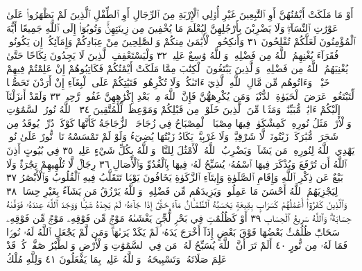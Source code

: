 أَوْ مَا مَلَكَتْ أَيْمَٰنُهُنَّ أَوِ ٱلتَّٰبِعِينَ غَيْرِ أُو۟لِي ٱلْإِرْبَةِ مِنَ
ٱلرِّجَالِ أَوِ ٱلطِّفْلِ ٱلَّذِينَ لَمْ يَظْهَرُوا۟ عَلَىٰ عَوْرَٰتِ ٱلنِّسَآءِۖ
وَلَا يَضْرِبْنَ بِأَرْجُلِهِنَّ لِيُعْلَمَ مَا يُخْفِينَ مِن زِينَتِهِنَّۚ وَتُوبُوٓا۟
إِلَى ٱللَّهِ جَمِيعًا أَيُّهَ ٱلْمُؤْمِنُونَ لَعَلَّكُمْ تُفْلِحُونَ ٣١
وَأَنكِحُوا۟ ٱلْأَيَٰمَىٰ مِنكُمْ وَٱلصَّٰلِحِينَ مِنْ عِبَادِكُمْ وَإِمَآئِكُمْۚ إِن
يَكُونُوا۟ فُقَرَآءَ يُغْنِهِمُ ٱللَّهُ مِن فَضْلِهِۦۗ وَٱللَّهُ وَٰسِعٌ عَلِيمࣱ ٣٢
وَلْيَسْتَعْفِفِ ٱلَّذِينَ لَا يَجِدُونَ نِكَاحًا حَتَّىٰ يُغْنِيَهُمُ ٱللَّهُ مِن فَضْلِهِۦۗ
وَٱلَّذِينَ يَبْتَغُونَ ٱلْكِتَٰبَ مِمَّا مَلَكَتْ أَيْمَٰنُكُمْ فَكَاتِبُوهُمْ إِنْ
عَلِمْتُمْ فِيهِمْ خَيْرࣰاۖ وَءَاتُوهُم مِّن مَّالِ ٱللَّهِ ٱلَّذِيٓ ءَاتَىٰكُمْۚ وَلَا تُكْرِهُوا۟
فَتَيَٰتِكُمْ عَلَى ٱلْبِغَآءِ إِنْ أَرَدْنَ تَحَصُّنࣰا لِّتَبْتَغُوا۟ عَرَضَ ٱلْحَيَوٰةِ
ٱلدُّنْيَاۚ وَمَن يُكْرِههُّنَّ فَإِنَّ ٱللَّهَ مِنۢ بَعْدِ إِكْرَٰهِهِنَّ غَفُورࣱ رَّحِيمࣱ ٣٣
وَلَقَدْ أَنزَلْنَآ إِلَيْكُمْ ءَايَٰتࣲ مُّبَيِّنَٰتࣲ وَمَثَلࣰا مِّنَ ٱلَّذِينَ خَلَوْا۟
مِن قَبْلِكُمْ وَمَوْعِظَةࣰ لِّلْمُتَّقِينَ ٣٤۞ ٱللَّهُ نُورُ ٱلسَّمَٰوَٰتِ وَٱلْأَرْضِۚ
مَثَلُ نُورِهِۦ كَمِشْكَوٰةࣲ فِيهَا مِصْبَاحٌۖ ٱلْمِصْبَاحُ فِي زُجَاجَةٍۖ
ٱلزُّجَاجَةُ كَأَنَّهَا كَوْكَبࣱ دُرِّيࣱّ يُوقَدُ مِن شَجَرَةࣲ مُّبَٰرَكَةࣲ زَيْتُونَةࣲ
لَّا شَرْقِيَّةࣲ وَلَا غَرْبِيَّةࣲ يَكَادُ زَيْتُهَا يُضِيٓءُ وَلَوْ لَمْ تَمْسَسْهُ نَارࣱۚ
نُّورٌ عَلَىٰ نُورࣲۚ يَهْدِي ٱللَّهُ لِنُورِهِۦ مَن يَشَآءُۚ وَيَضْرِبُ ٱللَّهُ ٱلْأَمْثَٰلَ
لِلنَّاسِۗ وَٱللَّهُ بِكُلِّ شَيْءٍ عَلِيمࣱ ٣٥ فِي بُيُوتٍ أَذِنَ ٱللَّهُ أَن تُرْفَعَ
وَيُذْكَرَ فِيهَا ٱسْمُهُۥ يُسَبِّحُ لَهُۥ فِيهَا بِٱلْغُدُوِّ وَٱلْأٓصَالِ ٣٦
رِجَالࣱ لَّا تُلْهِيهِمْ تِجَٰرَةࣱ وَلَا بَيْعٌ عَن ذِكْرِ ٱللَّهِ وَإِقَامِ ٱلصَّلَوٰةِ
وَإِيتَآءِ ٱلزَّكَوٰةِ يَخَافُونَ يَوْمࣰا تَتَقَلَّبُ فِيهِ ٱلْقُلُوبُ وَٱلْأَبْصَٰرُ ٣٧
لِيَجْزِيَهُمُ ٱللَّهُ أَحْسَنَ مَا عَمِلُوا۟ وَيَزِيدَهُم مِّن فَضْلِهِۦۗ وَٱللَّهُ
يَرْزُقُ مَن يَشَآءُ بِغَيْرِ حِسَابࣲ ٣٨ وَٱلَّذِينَ كَفَرُوٓا۟ أَعْمَٰلُهُمْ كَسَرَابِۭ
بِقِيعَةࣲ يَحْسَبُهُ ٱلظَّمْـَٔانُ مَآءً حَتَّىٰٓ إِذَا جَآءَهُۥ لَمْ يَجِدْهُ شَيْـࣰٔا
وَوَجَدَ ٱللَّهَ عِندَهُۥ فَوَفَّىٰهُ حِسَابَهُۥۗ وَٱللَّهُ سَرِيعُ ٱلْحِسَابِ ٣٩
أَوْ كَظُلُمَٰتࣲ فِي بَحْرࣲ لُّجِّيࣲّ يَغْشَىٰهُ مَوْجࣱ مِّن فَوْقِهِۦ مَوْجࣱ مِّن فَوْقِهِۦ
سَحَابࣱۚ ظُلُمَٰتُۢ بَعْضُهَا فَوْقَ بَعْضٍ إِذَآ أَخْرَجَ يَدَهُۥ لَمْ يَكَدْ
يَرَىٰهَاۗ وَمَن لَّمْ يَجْعَلِ ٱللَّهُ لَهُۥ نُورࣰا فَمَا لَهُۥ مِن نُّورٍ ٤٠ أَلَمْ تَرَ أَنَّ
ٱللَّهَ يُسَبِّحُ لَهُۥ مَن فِي ٱلسَّمَٰوَٰتِ وَٱلْأَرْضِ وَٱلطَّيْرُ صَٰٓفَّٰتࣲۖ كُلࣱّ
قَدْ عَلِمَ صَلَاتَهُۥ وَتَسْبِيحَهُۥۗ وَٱللَّهُ عَلِيمُۢ بِمَا يَفْعَلُونَ ٤١ وَلِلَّهِ مُلْكُ

